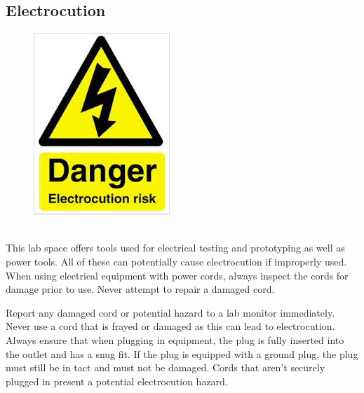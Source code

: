 \subsection{Electrocution}
\begin{framed}
\begin{figure}
\includegraphics[width=\linewidth]{images/electrocution_hazard.jpg}
\end{figure}
\ \\
This lab space offers tools used for electrical testing and prototyping as well as power tools. All of these can potentially cause electrocution if improperly used. When using electrical equipment with power cords, always inspect the cords for damage prior to use. Never attempt to repair a damaged cord.
\end{framed}
Report any damaged cord or potential hazard to a lab monitor immediately. Never use a cord that is frayed or damaged as this can lead to electrocution.  Always ensure that when plugging in equipment, the plug is fully inserted into the outlet and has a snug fit. If the plug is equipped with a ground plug, the plug must still be in tact and must not be damaged.  Cords that aren't securely plugged in present a potential electrocution hazard. 

